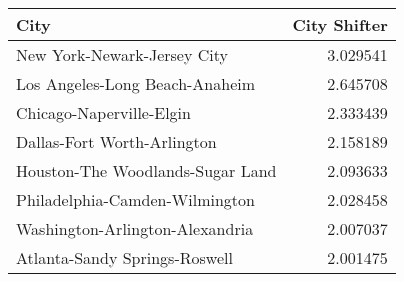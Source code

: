 \begin{tabular}{lr}
\toprule
City & City Shifter \\
\midrule
New York-Newark-Jersey City & 3.029541 \\
Los Angeles-Long Beach-Anaheim & 2.645708 \\
Chicago-Naperville-Elgin & 2.333439 \\
Dallas-Fort Worth-Arlington & 2.158189 \\
Houston-The Woodlands-Sugar Land & 2.093633 \\
Philadelphia-Camden-Wilmington & 2.028458 \\
Washington-Arlington-Alexandria & 2.007037 \\
Atlanta-Sandy Springs-Roswell & 2.001475 \\
\bottomrule
\end{tabular}
